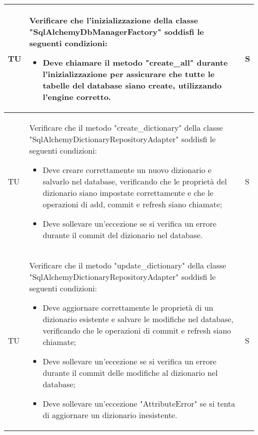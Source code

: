 \begin{adjustwidth}{-0.5cm}{-0.5cm}
\begin{longtable}{|P{1.5cm}|>{\raggedright}P{9.5cm}|>{\arraybackslash}P{1.5cm}|}
		\hline TU & Verificare che l'inizializzazione della classe "SqlAlchemyDbManagerFactory" soddisfi le seguenti condizioni:
		\begin{itemize}
			\item Deve chiamare il metodo "create\_all" durante l'inizializzazione per assicurare che tutte le tabelle del database siano create, utilizzando l'engine corretto.
		\end{itemize} & S \\

		\hline TU & Verificare che il metodo "create\_dictionary" della classe "SqlAlchemyDictionaryRepositoryAdapter" soddisfi le seguenti condizioni:
		\begin{itemize}
			\item Deve creare correttamente un nuovo dizionario e salvarlo nel database, verificando che le proprietà del dizionario siano impostate correttamente e che le operazioni di add, commit e refresh siano chiamate;
			\item Deve sollevare un'eccezione se si verifica un errore durante il commit del dizionario nel database.
		\end{itemize} & S \\

		\hline TU & Verificare che il metodo "update\_dictionary" della classe "SqlAlchemyDictionaryRepositoryAdapter" soddisfi le seguenti condizioni:
		\begin{itemize}
			\item Deve aggiornare correttamente le proprietà di un dizionario esistente e salvare le modifiche nel database, verificando che le operazioni di commit e refresh siano chiamate;
			\item Deve sollevare un'eccezione se si verifica un errore durante il commit delle modifiche al dizionario nel database;
			\item Deve sollevare un'eccezione "AttributeError" se si tenta di aggiornare un dizionario inesistente.
		\end{itemize} & S \\


\end{longtable}
\end{adjustwidth}
